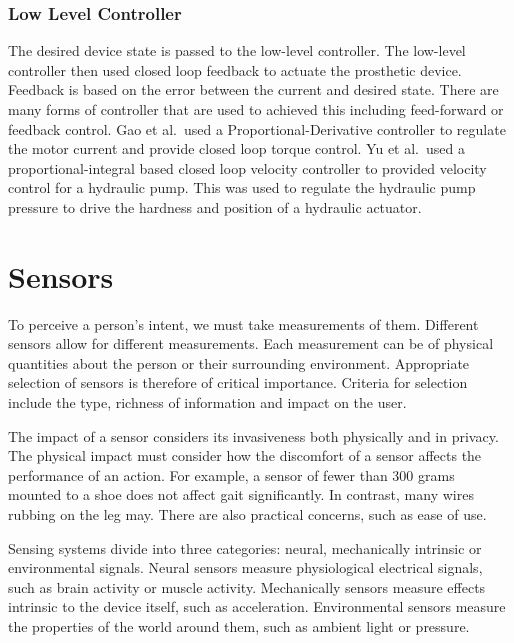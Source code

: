 \subsubsection{Low Level Controller}
The desired device state is passed to the low-level controller. The low-level controller then used closed loop feedback to actuate the prosthetic device. Feedback is based on the error between the current and desired state. There are many forms of controller that are used to achieved this including feed-forward or feedback control.\cite{Tucker2015} Gao et al.~used a Proportional-Derivative controller to regulate the motor current and provide closed loop torque control\cite{Gao2020b}. Yu et al.~used a proportional-integral based closed loop velocity controller to provided velocity control for a hydraulic pump. This was used to regulate the hydraulic pump pressure to drive the hardness and position of a hydraulic actuator.\cite{Yu2019}

\section{Sensors}
\label{sec:background-sensors}
To perceive a person's intent, we must take measurements of them\cite{Asif2021, Hernandez2021}. Different sensors allow for different measurements. Each measurement can be of physical quantities about the person or their surrounding environment. Appropriate selection of sensors is therefore of critical importance. Criteria for selection include the type, richness of information and impact on the user.\cite{Tucker2015}

The impact of a sensor considers its invasiveness both physically and in privacy. The physical impact must consider how the discomfort of a sensor affects the performance of an action. For example, a sensor of fewer than 300 grams mounted to a shoe does not affect gait significantly\cite{AbdulRazak2012}. In contrast, many wires rubbing on the leg may. There are also practical concerns, such as ease of use.

Sensing systems divide into three categories: neural, mechanically intrinsic or environmental signals. Neural sensors measure physiological electrical signals, such as brain activity or muscle activity. Mechanically sensors measure effects intrinsic to the device itself, such as acceleration. Environmental sensors measure the properties of the world around them, such as ambient light or pressure.\cite{Koller2018, Tucker2015}

